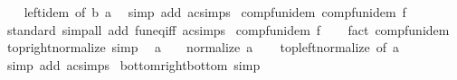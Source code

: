 \begin{isabellebody}
%
\isadelimproof
\ \ %
\endisadelimproof
%
\isatagproof
{}\isamarkupfalse%
\ left{\isacharunderscore}{\kern0pt}idem\ {\isacharbrackleft}{\kern0pt}of\ b\ a{\isacharbrackright}{\kern0pt}\ \isamarkupfalse%
\ {\isacharparenleft}{\kern0pt}simp\ add{\isacharcolon}{\kern0pt}\ ac{\isacharunderscore}{\kern0pt}simps{\isacharparenright}{\kern0pt}%
\endisatagproof
{\isafoldproof}%
%
\isadelimproof
\isanewline
%
\endisadelimproof
\isanewline
{}\isamarkupfalse%
\ comp{\isacharunderscore}{\kern0pt}fun{\isacharunderscore}{\kern0pt}idem{\isacharcolon}{\kern0pt}\ {\isachardoublequoteopen}comp{\isacharunderscore}{\kern0pt}fun{\isacharunderscore}{\kern0pt}idem\ f{\isachardoublequoteclose}\isanewline
%
\isadelimproof
\ \ %
\endisadelimproof
%
\isatagproof
{}\isamarkupfalse%
\ standard\ {\isacharparenleft}{\kern0pt}simp{\isacharunderscore}{\kern0pt}all\ add{\isacharcolon}{\kern0pt}\ fun{\isacharunderscore}{\kern0pt}eq{\isacharunderscore}{\kern0pt}iff\ ac{\isacharunderscore}{\kern0pt}simps{\isacharparenright}{\kern0pt}%
\endisatagproof
{\isafoldproof}%
%
\isadelimproof
\isanewline
%
\endisadelimproof
\isanewline
{}\isamarkupfalse%
\ comp{\isacharunderscore}{\kern0pt}fun{\isacharunderscore}{\kern0pt}idem\ f\isanewline
%
\isadelimproof
\ \ %
\endisadelimproof
%
\isatagproof
{}\isamarkupfalse%
\ {\isacharparenleft}{\kern0pt}fact\ comp{\isacharunderscore}{\kern0pt}fun{\isacharunderscore}{\kern0pt}idem{\isacharparenright}{\kern0pt}%
\endisatagproof
{\isafoldproof}%
%
\isadelimproof
\isanewline
%
\endisadelimproof
\isanewline
{}\isamarkupfalse%
\ top{\isacharunderscore}{\kern0pt}right{\isacharunderscore}{\kern0pt}normalize\ {\isacharbrackleft}{\kern0pt}simp{\isacharbrackright}{\kern0pt}{\isacharcolon}{\kern0pt}\isanewline
\ \ {\isachardoublequoteopen}a\ \isactrlbold {\isacharasterisk}{\kern0pt}\ \isactrlbold {\isasymtop}\ {\isacharequal}{\kern0pt}\ normalize\ a{\isachardoublequoteclose}\isanewline
%
\isadelimproof
\ \ %
\endisadelimproof
%
\isatagproof
{}\isamarkupfalse%
\ top{\isacharunderscore}{\kern0pt}left{\isacharunderscore}{\kern0pt}normalize\ {\isacharbrackleft}{\kern0pt}of\ a{\isacharbrackright}{\kern0pt}\ \isamarkupfalse%
\ {\isacharparenleft}{\kern0pt}simp\ add{\isacharcolon}{\kern0pt}\ ac{\isacharunderscore}{\kern0pt}simps{\isacharparenright}{\kern0pt}%
\endisatagproof
{\isafoldproof}%
%
\isadelimproof
\isanewline
%
\endisadelimproof
\isanewline
{}\isamarkupfalse%
\ bottom{\isacharunderscore}{\kern0pt}right{\isacharunderscore}{\kern0pt}bottom\ {\isacharbrackleft}{\kern0pt}simp{\isacharbrackright}{\kern0pt}{\isacharcolon}{\kern0pt}\isanewline

\end{isabellebody}
